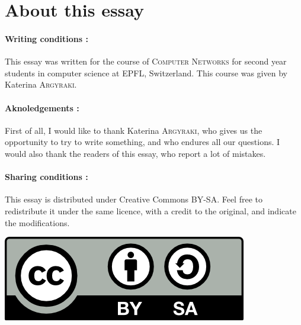 \documentclass[a4paper, onecolumn, 10pt]{article}
\numberwithin{equation}{section}
\begin{document}
\section{About this essay}
\paragraph{Writing conditions :}This essay was written for the course of \textsc{Computer Networks} for second year students in computer science at EPFL, Switzerland. This course was given by Katerina \textsc{Argyraki}. 
\paragraph{Aknoledgements :}
First of all, I would like to thank Katerina \textsc{Argyraki}, who gives us the opportunity to try to write something, and who endures all our questions. I would also thank the readers of this essay, who report a lot of mistakes. 
\paragraph{Sharing conditions :}This essay is distributed under Creative Commons BY-SA. Feel free to redistribute it under the same licence, with a credit to the original, and indicate the modifications.\newline
\begin{flushright}
\includegraphics[scale=0.8]{by-sa.png}
\end{flushright}
\end{document}
